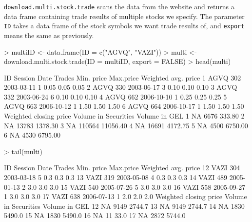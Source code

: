 \documentclass[a4paper]{article}
\begin{document}
\texttt{download.multi.stock.trade} scans the data from the website and returns a data frame containing trade results of multiple stocks we specify. The parameter \texttt{ID} takes a data frame of the stock symbols we want trade results of, and \texttt{export} means the same as previously.

\begin{Schunk}
\begin{Sinput}
> multiID <- data.frame(ID = c("AGVQ", "VAZI"))
> multi <- download.multi.stock.trade(ID = multiID, export = FALSE)
> head(multi)
\end{Sinput}
\begin{Soutput}
    ID Session       Date Trades Min. price Max.price Weighted avg. price
1 AGVQ     302 2003-03-11      1       0.05      0.05                0.05
2 AGVQ     330 2003-06-17      3       0.10      0.10                0.10
3 AGVQ     332 2003-06-24      6       0.10      0.10                0.10
4 AGVQ     662 2006-10-10      1       0.25      0.25                0.25
5 AGVQ     663 2006-10-12      1       1.50      1.50                1.50
6 AGVQ     664 2006-10-17      1       1.50      1.50                1.50
  Weighted closing price Volume in Securities Volume in GEL
1                     NA                 6676        333.80
2                     NA                13783       1378.30
3                     NA               110564      11056.40
4                     NA                16691       4172.75
5                     NA                 4500       6750.00
6                     NA                 4530       6795.00
\end{Soutput}
\begin{Sinput}
> tail(multi)
\end{Sinput}
\begin{Soutput}
     ID Session       Date Trades Min. price Max.price Weighted avg. price
12 VAZI     304 2003-03-18      5        0.3       0.3                 0.3
13 VAZI     319 2003-05-08      4        0.3       0.3                 0.3
14 VAZI     489 2005-01-13      2        3.0       3.0                 3.0
15 VAZI     540 2005-07-26      5        3.0       3.0                 3.0
16 VAZI     558 2005-09-27      1        3.0       3.0                 3.0
17 VAZI     638 2006-07-13      1        2.0       2.0                 2.0
   Weighted closing price Volume in Securities Volume in GEL
12                     NA                 9149        2744.7
13                     NA                 9149        2744.7
14                     NA                 1830        5490.0
15                     NA                 1830        5490.0
16                     NA                   11          33.0
17                     NA                 2872        5744.0
\end{Soutput}
\end{Schunk}
\end{document}
